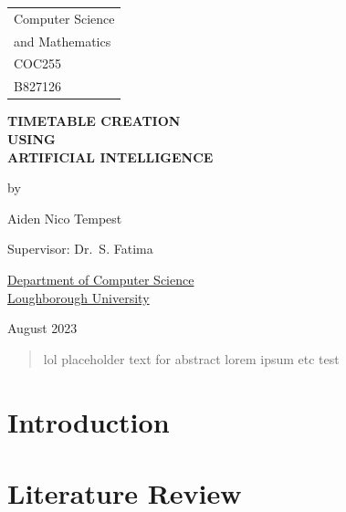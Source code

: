 \documentclass[a4paper, 12pt]{report}
\begin{document}
\graphicspath{{../doc-imgs/}}

\thispagestyle{empty}
\begin{center}
	\Large{
		\hfill \begin{tabular}{l}
			Computer Science\\and Mathematics\\COC255\\B827126
		\end{tabular} %
	}
	\vspace*{\fill}

	\Large{\textbf{TIMETABLE CREATION\\USING\\ARTIFICIAL INTELLIGENCE}}

	\vspace*{\fill}

	by

	\vspace*{\fill}

	Aiden Nico Tempest

	\vspace*{\fill}

	Supervisor: Dr.\ S. Fatima

	\vspace*{\fill}

	\underline{Department of Computer Science} \\ \underline{Loughborough
	University}

	\vspace*{\fill}
	
	August 2023

\end{center} %

\newpage
\begin{abstract} %
	lol placeholder text for abstract lorem ipsum etc test
\end{abstract}


\tableofcontents

\newpage

\chapter{Introduction} %

\chapter{Literature Review}
\end{document}
